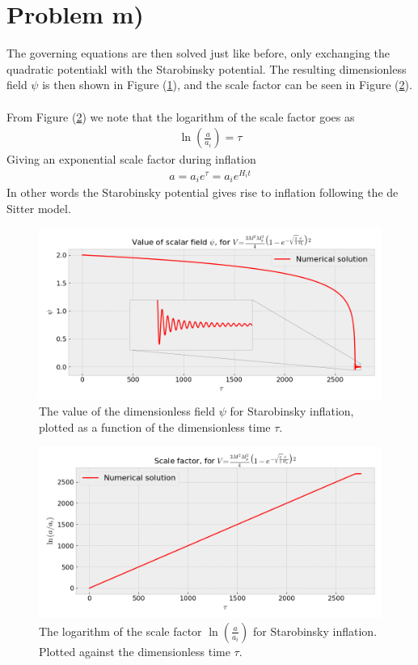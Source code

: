 \documentclass[reprint,english,notitlepage]{revtex4-1}  %
\numberwithin{equation}{section}
\begin{document}
\section{Problem m)}
The governing equations are then solved just like before, only exchanging the
quadratic potentiakl with the Starobinsky potential. The resulting dimensionless
field $\psi$ is then shown in Figure (\ref{fig:Starobinsky_psi}), and the scale
factor can be seen in Figure (\ref{fig:Starobinsky_a}).
\\ \\
From Figure (\ref{fig:Starobinsky_a}) we note that the logarithm of the scale
factor goes as
\begin{align}
	\ln\left( \frac{a}{a_i}\right) = \tau
\end{align}
Giving an exponential scale factor during inflation
\begin{align}
	a = a_i e^\tau = a_i e^{H_i t}
\end{align}
In other words the Starobinsky potential gives rise to inflation following
the de Sitter model.
\begin{figure}[h!]
	\includegraphics[width=\linewidth]{StarobinskyPotential_field-value.png}
	\caption{The value of the dimensionless field $\psi$ for Starobinsky inflation,
	plotted as a function of the dimensionless time $\tau$.}
	\label{fig:Starobinsky_psi}
\end{figure}

\begin{figure}[h!]
	\includegraphics[width=\linewidth]{StarobinskyPotential_scale-factor.png}
	\caption{The logarithm of the scale factor $\ln\left(\frac{a}{a_i}\right)$
	for Starobinsky inflation. Plotted against the dimensionless time $\tau$.}
	\label{fig:Starobinsky_a}
\end{figure}
\end{document}
